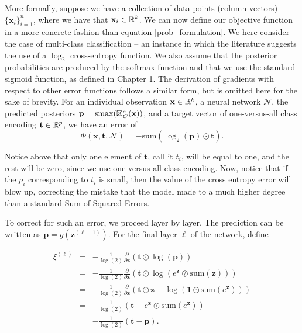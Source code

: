 More formally, suppose we have a collection of data points (column vectors) $\{\mathbf{x}_i\}_{i=1}^n$, where we have that $\mathbf{x}_i\in\mathbb{R}^k$. We can now define our objective function in a more concrete fashion than equation \eqref{prob_formulation}. We here consider the case of multi-class classification -- an instance in which the literature suggests the use of a $\log_2$ cross-entropy function. We also assume that the posterior probabilities are produced by the softmax function and that we use the standard sigmoid function, as defined in Chapter 1. The derivation of gradients with respect to other error functions follows a similar form, but is omitted here for the sake of brevity. For an individual observation $\mathbf{x}\in\mathbb{R}^k$, a neural network $\mathcal{N}$, the predicted posteriors $\mathbf{p} = \mathrm{smax}(\boxtimes_{C}^{s}(\mathbf{x}))$, and a target vector of one-versus-all class encoding $\mathbf{t}\in\mathbb{R}^p$, we have an error of 
\begin{equation}
\Phi(\mathbf{x}, \mathbf{t}, \mathcal{N}) = -\text{sum}(\log_2(\mathbf{p}) \odot \mathbf{t}).
\end{equation}

Notice above that only one element of $\mathbf{t}$, call it $t_i$, will be equal to one, and the rest will be zero, since we use one-versus-all class encoding. Now, notice that if the $p_i$ corresponding to $t_i$ is small, then the value of the cross entropy error will blow up, correcting the mistake that the model made to a much higher degree than a standard Sum of Squared Errors. 

To correct for such an error, we proceed layer by layer. The prediction can be written as $\mathbf{p} = g(\mathbf{z}^{(\ell-1)})$. For the final layer $\ell$ of the network, define

\begin{eqnarray}
\label{eq:finallayer}
\xi^{(\ell)}&=&-\frac{1}{\log(2)}\frac{\partial}{\partial \mathbf{z}}(\mathbf{t}\odot\log(\mathbf{p}))\\
&=&-\frac{1}{\log(2)}\frac{\partial}{\partial \mathbf{z}}(\mathbf{t}\odot\log(e^{\mathbf{z}}\oslash \text{sum}(\mathbf{z})))\\
&=&-\frac{1}{\log(2)}\frac{\partial}{\partial \mathbf{z}}(\mathbf{t}\odot\mathbf{z}- \log(\mathbf{1}\odot\text{sum}(e^{\mathbf{z}})))\\
 &=&-\frac{1}{\log(2)}(\mathbf{t} - e^{\mathbf{z}}\oslash\text{sum}(e^{\mathbf{z}})) \\ 
 &=&-\frac{1}{\log(2)}(\mathbf{t} - \mathbf{p}).
\end{eqnarray}

